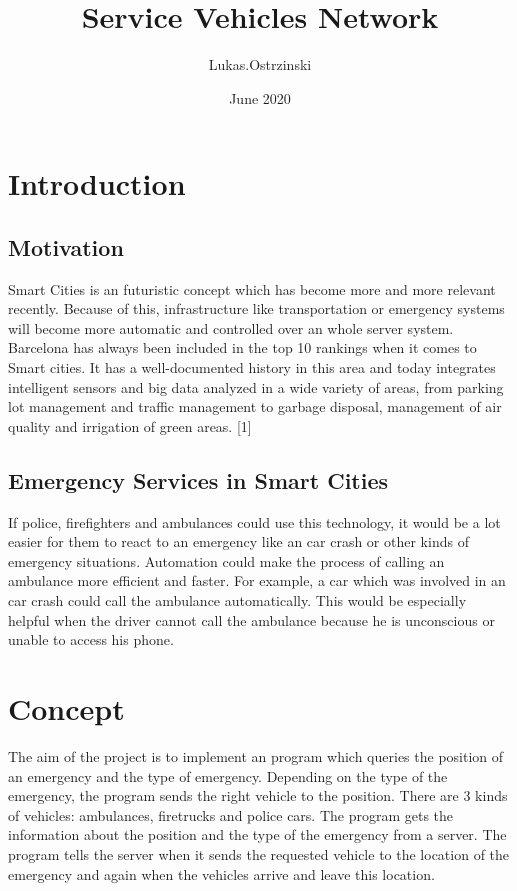\documentclass{article}
\title{Service Vehicles Network}
\author{Lukas.Ostrzinski }
\date{June 2020}
\begin{document}
\maketitle

\section{Introduction}

\subsection{Motivation}
Smart Cities is an futuristic concept which has become more and more relevant recently. Because of this, infrastructure like transportation or emergency systems will become more automatic and controlled over an whole server system. 
\newline
Barcelona has always been included in the top 10 rankings when it comes to Smart cities. It has a well-documented history in this area and today integrates intelligent sensors and big data analyzed in a wide variety of areas, from parking lot management and traffic management to garbage disposal, management of air quality and irrigation of green areas. [1]

\subsection{Emergency Services in Smart Cities}
If police, firefighters and ambulances could use this technology, it would be a lot easier for them to react to an emergency like an car crash or other kinds of emergency situations. Automation could make the process of calling an ambulance more efficient and faster. For example, a car which was involved in an car crash could call the ambulance automatically. This would be especially helpful when the driver cannot call the ambulance because he is unconscious or unable to access his phone.




\section{Concept}
The aim of the project is to implement an program which queries the position of an emergency and the type of emergency. Depending on the type of the emergency, the program sends the right vehicle to the position. 
There are 3 kinds of vehicles: ambulances, firetrucks and police cars.
\newline
The program gets the information about the position and the type of the emergency from a server. The program tells the server when it sends the requested vehicle to the location of the emergency and again when the vehicles arrive and leave this location. 
\end{document}
